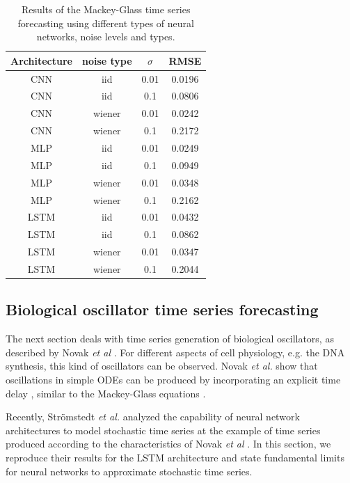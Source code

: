 \begin{table}
    \centering
    \begin{tabular}{c|c|c|c}
        Architecture & noise type & $\sigma$ & RMSE   \\
        \hline
        CNN          & iid        & 0.01     & 0.0196 \\
        CNN          & iid        & 0.1      & 0.0806 \\
        CNN          & wiener     & 0.01     & 0.0242 \\
        CNN          & wiener     & 0.1      & 0.2172 \\
        MLP          & iid        & 0.01     & 0.0249 \\
        MLP          & iid        & 0.1      & 0.0949 \\
        MLP          & wiener     & 0.01     & 0.0348 \\
        MLP          & wiener     & 0.1      & 0.2162 \\
        LSTM         & iid        & 0.01     & 0.0432 \\
        LSTM         & iid        & 0.1      & 0.0862 \\
        LSTM         & wiener     & 0.01     & 0.0347 \\
        LSTM         & wiener     & 0.1      & 0.2044 \\
    \end{tabular}
    \caption{Results of the Mackey-Glass time series forecasting using different
        types of neural networks, noise levels and types.}
    \label{tab:mackey_noise}
\end{table}

\subsection{Biological oscillator time series forecasting}

The next section deals with time series generation of biological oscillators,
as described by Novak \textit{et al} \cite{novak2008}. For different aspects of
cell physiology, e.g. the DNA synthesis, this kind of oscillators can be
observed. Novak \textit{et al.} show that oscillations in simple ODEs can be
produced by incorporating an explicit time delay \cite{novak2008}, similar to
the Mackey-Glass equations \cite{mackey1977}.

Recently, Strömstedt \textit{et al.} analyzed the capability of neural network
architectures to model stochastic time series \cite{stroemstedt2018} at the
example of time series produced according to the characteristics of Novak
\textit{et al} \cite{novak2008}. In this section, we reproduce their results for
the LSTM architecture and state fundamental limits for neural networks to
approximate stochastic time series.

